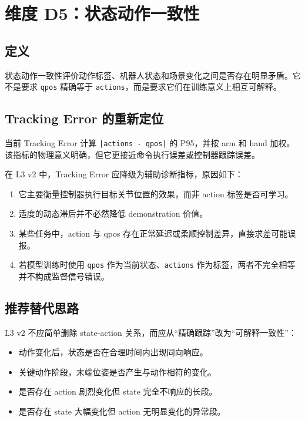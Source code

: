 \documentclass[UTF8,zihao=-4]{ctexart}
\begin{document}
\section{维度 D5：状态动作一致性}

\subsection{定义}

状态动作一致性评价动作标签、机器人状态和场景变化之间是否存在明显矛盾。它不是要求 \texttt{qpos} 精确等于 \texttt{actions}，而是要求它们在训练意义上相互可解释。

\subsection{Tracking Error 的重新定位}

当前 Tracking Error 计算 \texttt{|actions - qpos|} 的 P95，并按 arm 和 hand 加权。该指标的物理意义明确，但它更接近命令执行误差或控制器跟踪误差。

在 L3 v2 中，Tracking Error 应降级为辅助诊断指标，原因如下：

\begin{enumerate}
  \item 它主要衡量控制器执行目标关节位置的效果，而非 action 标签是否可学习。
  \item 适度的动态滞后并不必然降低 demonstration 价值。
  \item 某些任务中，action 与 qpos 存在正常延迟或柔顺控制差异，直接求差可能误报。
  \item 若模型训练时使用 \texttt{qpos} 作为当前状态、\texttt{actions} 作为标签，两者不完全相等并不构成监督信号错误。
\end{enumerate}

\subsection{推荐替代思路}

L3 v2 不应简单删除 state-action 关系，而应从“精确跟踪”改为“可解释一致性”：

\begin{itemize}
  \item 动作变化后，状态是否在合理时间内出现同向响应。
  \item 关键动作阶段，末端位姿是否产生与动作相符的变化。
  \item 是否存在 action 剧烈变化但 state 完全不响应的长段。
  \item 是否存在 state 大幅变化但 action 无明显变化的异常段。
\end{itemize}
\end{document}
